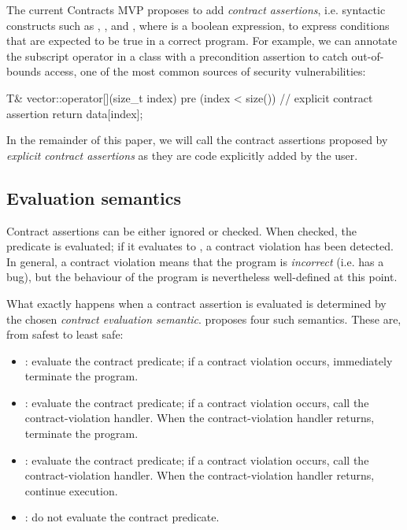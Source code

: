 The current Contracts MVP \cite{P2900R6} proposes to add \emph{contract assertions}, i.e. syntactic constructs such as , , and , where  is a boolean expression, to express conditions that are expected to be true in a correct program. For example, we can annotate the subscript operator in a  class with a precondition assertion to catch out-of-bounds access, one of the most common sources of security vulnerabilities:
\begin{codeblock}
T& vector::operator[](size_t index)
pre (index < size()) {  // explicit contract assertion
  return data[index];     
}
\end{codeblock}

In the remainder of this paper, we will call the contract assertions proposed by  \cite{P2900R6} \emph{explicit contract assertions} as they are code explicitly added by the user.

\subsection{Evaluation semantics}

Contract assertions can be either ignored or checked. When checked, the predicate  is evaluated; if it evaluates to , a contract violation has been detected. In general, a contract violation means that the program is \emph{incorrect} (i.e. has a bug), but the behaviour of the program is nevertheless well-defined at this point. 

What exactly happens when a contract assertion is evaluated is determined by the chosen \emph{contract evaluation semantic}. \cite{P2900R6} proposes four such semantics. These are, from safest to least safe:
\begin{itemize}
\item {}: evaluate the contract predicate; if a contract violation occurs, immediately terminate the program.
\item {}: evaluate the contract predicate; if a contract violation occurs, call the contract-violation handler. When the contract-violation handler returns, terminate the program.
\item {}: evaluate the contract predicate; if a contract violation occurs, call the contract-violation handler. When the contract-violation handler returns, continue execution.
\item {}: do not evaluate the contract predicate.
\end{itemize}

